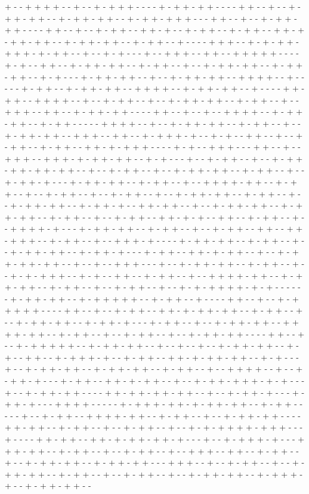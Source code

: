 + - - + + + + - - + - - + - + + + - - - - + - + + - + + - - - - + + - - + - - + - + + - + + - - + - + + - + + - - + - + + - + + + - - - + + - - + - - + - + + - + + - - - - + + - - + - - + - + + - - + + - + - - + - + + - - + - + + - - + + - + - + + - + + - - + - + + - + + - - + - + + - - + - - - - + + + - - + - + - + + - + + + - + - + + - - + - - + - + - - - + - - + + + - - + + - - + + + + + - - - - + - + - - + + - - + - + + - + + - - + - + + - - + - - + - + + - + + - - + - + + - + + - - + - + - - - + - + + - + + - - + - - + - + + - + + - - + + + + - - + - - - - - + - + + - - + - + + - + + - - + + + + - - + - + + - + + - - + - - - - + + - + + - - + + + + - - + - - + - + + - - + - - + - + + - + + - - + - + + - - + - - + + + - - + + - - + - + + - + + - - - - + + - - + - - + - - + + + + - - + - + + - + + - - + - + + - - - - - + + + + - - + - - + - + + - + + - - + - + + - - + - - + - + + - + + - - + + + - - + + - - + - + + + - + - - + - + - - + + - - + - - + - + + - - + - + + - - + + - + - + + + - - - - + - + - - + + + - - - + + - - + - - + + + - - + + + - + - + + - + + - - + - + - - - + - - + - + + - - + - - + - + + - + + - + + - + + - - + - - + - + + - - + - - + - + + - + + - - + - + + - - + - - + - + + - + - - - + - + + - + + - - + - + + - - + - - + + + + - + + - - + - + + - - + - - + - + + - - + - - + - + + - - + - - + - + + - + + - - + - + + - - + - - + - + + - + + - - + - + + - + - - + + - + + - - + - - + - + + - + + - - + - + + - + + - - + - + + - - + - - + - + + - - + + - + - + - - + + - - + - + + - - + - - + + + + - + - - - + - + + - + + - - + - + + - - + - - + - + + - - + + - - + + - + + + - - + - + + - - + - - + + + - + - - - - + - + + - + + - - + - + + - - + - - + - + + - + + - - + - + + - + - - - + - + + - - + + - + - + + - - + - - + - + + - + + - + + - - + - - + - - + + + - - - + - - + - + + - + + - - + - + + - - + - - + - + - + + + - - + - + - - + + - - + - + + - - + - - + + + + - + + - - + - + + - + + - - + - + + - - + - - + - + + - - + - - + - + - + + + + - + - + - - - - - - + - + + - + + - - + - + + + + + - - + - + + - - + - - - - + + - - + - - + - + + + + + - - - - + + - - + - - + - + + - - + + - + - + + - + + - - + - + + - - + - - + - + + - + + - - + - + + - + - - - + - + + - - + - - + - + + - + + - - + + + + - + + - - + - + + - - + - - + - + + - - + - - + - + + - + + - - - - + + - - + - - + - + + + + + - - + - + + - + + - - + - - + - - + - - + - + + - + + - - + - + - - + + - - + - + + + - + - - + - + + - - + + - + - + + - + + - - + - + - - - + - - + - + + - + + - - + - + + - + + - - + - + + - - + - - + + + + - - + - - + - + + - + - - - + - + + - - + + - + - + + - - + - - + - + + - + + + - + - + - - - + - - + - + + - + + - - - - + + - + + - + + - + + - - + - - + - + + - + - - - + - + + - + - - - + + + + - - - - - + - + + + - + + - + - + + - + + - - + - + + - - - - - + - - + - + + - - + + + + - + + - - + - + + - - + - - + - + + - + + - - - - + + - + + - - + - + + - - + - - + - + + - - + - - + - + - + + + + - + + + - - - + - - - - + + - + + - - + + - + - + + - + + - + - - - + - - + - + + + - + - - - + + + - + + - - + - + + - - + - - + - + + - - + - - + + + - - + + - - + - + + - - + - - + - + + - + + - - + - + + - + + - - - + + + - - + - - + - + + - - + - - + - + + - + + - - + - + + - - + - - + - + + - - + - - + - + + - + + - - + - + + + - + - - + - + + - + + - - 